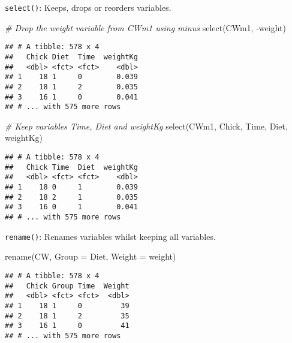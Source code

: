 \documentclass[
]{book}
\newenvironment{Shaded}{\begin{snugshade}}{\end{snugshade}}
\newcommand{\AttributeTok}[1]{\textcolor[rgb]{0.77,0.63,0.00}{#1}}
\newcommand{\CommentTok}[1]{\textcolor[rgb]{0.56,0.35,0.01}{\textit{#1}}}
\newcommand{\FunctionTok}[1]{\textcolor[rgb]{0.00,0.00,0.00}{#1}}
\newcommand{\NormalTok}[1]{#1}
\newcommand{\SpecialCharTok}[1]{\textcolor[rgb]{0.00,0.00,0.00}{#1}}
\begin{document}
\hfill\break

\texttt{select()}: Keeps, drops or reorders variables.

\begin{Shaded}
\begin{Highlighting}[]
\CommentTok{\# Drop the weight variable from CWm1 using minus}
\FunctionTok{select}\NormalTok{(CWm1, }\SpecialCharTok{{-}}\NormalTok{weight)}
\end{Highlighting}
\end{Shaded}

\begin{verbatim}
## # A tibble: 578 x 4
##   Chick Diet  Time  weightKg
##   <dbl> <fct> <fct>    <dbl>
## 1    18 1     0        0.039
## 2    18 1     2        0.035
## 3    16 1     0        0.041
## # ... with 575 more rows
\end{verbatim}

\begin{Shaded}
\begin{Highlighting}[]
\CommentTok{\# Keep variables Time, Diet and weightKg}
\FunctionTok{select}\NormalTok{(CWm1, Chick, Time, Diet, weightKg)}
\end{Highlighting}
\end{Shaded}

\begin{verbatim}
## # A tibble: 578 x 4
##   Chick Time  Diet  weightKg
##   <dbl> <fct> <fct>    <dbl>
## 1    18 0     1        0.039
## 2    18 2     1        0.035
## 3    16 0     1        0.041
## # ... with 575 more rows
\end{verbatim}

\hfill\break

\texttt{rename()}: Renames variables whilst keeping all variables.

\begin{Shaded}
\begin{Highlighting}[]
\FunctionTok{rename}\NormalTok{(CW, }\AttributeTok{Group =}\NormalTok{ Diet, }\AttributeTok{Weight =}\NormalTok{ weight)}
\end{Highlighting}
\end{Shaded}

\begin{verbatim}
## # A tibble: 578 x 4
##   Chick Group Time  Weight
##   <dbl> <fct> <fct>  <dbl>
## 1    18 1     0         39
## 2    18 1     2         35
## 3    16 1     0         41
## # ... with 575 more rows
\end{verbatim}

\hfill\break
\end{document}
